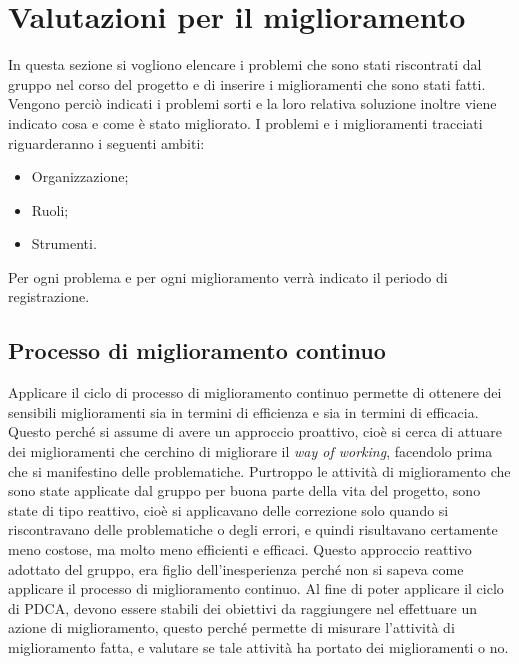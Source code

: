 \clearpage
\section{Valutazioni per il miglioramento}
In questa sezione si vogliono elencare i problemi che sono stati riscontrati dal gruppo nel corso del progetto e di inserire i miglioramenti che sono stati fatti. Vengono perciò indicati i problemi sorti e la loro relativa soluzione inoltre viene indicato cosa e come è stato migliorato.
I problemi e i miglioramenti tracciati riguarderanno i seguenti ambiti:
\begin{itemize}
\item Organizzazione;
\item Ruoli;
\item Strumenti.
\end{itemize}
Per ogni problema e per ogni miglioramento verrà indicato il periodo di registrazione.
\subsection{Processo di miglioramento continuo}
Applicare il ciclo di processo di miglioramento continuo permette di ottenere dei sensibili miglioramenti sia in termini di efficienza e sia in termini di efficacia. Questo perché si assume di avere un approccio proattivo, cioè si cerca di attuare dei miglioramenti che cerchino di migliorare il \textsl{way of working}, facendolo prima che si manifestino delle problematiche. Purtroppo le attività di miglioramento che sono state applicate dal gruppo per buona parte della vita del progetto, sono state di tipo reattivo, cioè si applicavano delle correzione solo quando si riscontravano delle problematiche o degli errori, e quindi risultavano certamente meno costose, ma molto meno efficienti e efficaci. Questo approccio reattivo adottato del gruppo, era figlio dell'inesperienza perché non si sapeva come applicare il processo di miglioramento continuo. Al fine di poter applicare il ciclo di PDCA, devono essere stabili dei obiettivi da raggiungere nel effettuare un azione di miglioramento, questo perché permette di misurare l'attività di miglioramento fatta, e valutare se tale attività ha portato dei miglioramenti o no.
